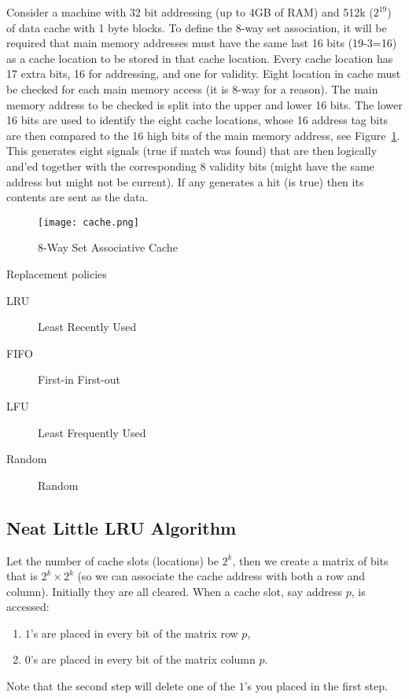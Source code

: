 \vspace{.1in}

Consider a machine with 32 bit addressing (up to 4GB of RAM) and 512k ($2^{19}$) of data cache with 1 byte blocks.  To define the 8-way set association, it will be required that main memory addresses must have the same last 16 bits (19-3=16) as a cache location to be stored in that cache location.  Every cache location has 17 extra bits, 16 for addressing, and one for validity.  Eight location in cache must be checked for each main memory access (it is 8-way for a reason).  The main memory address to be checked is split into the upper and lower 16 bits.  The lower 16 bits are used to identify the eight cache locations, whose 16 address tag bits are then compared to the 16 high bits of the main memory address, see Figure~\ref{f-8wsac}.  This generates eight signals (true if match was found) that are then logically and'ed together with the corresponding 8 validity bits (might have the same address but might not be current).  If any generates a hit (is true) then its contents are sent as the data.

\begin{figure}
  \texttt{[image: cache.png]}\\
  \caption{8-Way Set Associative Cache}\label{f-8wsac}
\end{figure}

Replacement policies
\begin{description}
    \item[LRU] Least Recently Used
    \item[FIFO] First-in First-out
    \item[LFU] Least Frequently Used
    \item[Random] Random
\end{description}

\subsection{Neat Little LRU Algorithm}

Let the number of cache slots (locations) be $2^k$, then we create a matrix of bits that is $2^k\times 2^k$ (so we can associate the cache address with both a row and column).  Initially they are all cleared.  When a cache slot, say address $p$, is accessed:
\begin{enumerate}
    \item $1$'s are placed in every bit of the matrix row $p$,
    \item $0$'s are placed in every bit of the matrix column $p$.
\end{enumerate}
Note that the second step will delete one of the $1$'s you placed in the first step.

